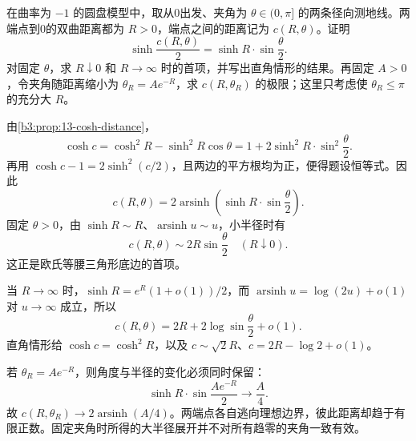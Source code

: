 \begin{exercise}[夹角与观察尺度]\label{b3:ex:13-1}
在曲率为 \(-1\) 的圆盘模型中，取从0出发、夹角为 \(\theta\in(0,\pi]\) 的两条径向测地线。两端点到0的双曲距离都为 \(R>0\)，端点之间的距离记为 \(c(R,\theta)\)。证明
\[
 \sinh\frac{c(R,\theta)}2=\sinh R\cdot\sin\frac\theta2.
\]
对固定 \(\theta\)，求 \(R\downarrow0\) 和 \(R\rightarrow\infty\) 时的首项，并写出直角情形的结果。再固定 \(A>0\)，令夹角随距离缩小为 \(\theta_R=Ae^{-R}\)，求 \(c(R,\theta_R)\) 的极限；这里只考虑使 \(\theta_R\le\pi\) 的充分大 \(R\)。
\end{exercise}
\begin{solution}
由\cref{b3:prop:13-cosh-distance}，
\[
 \cosh c=\cosh^2R-\sinh^2R\cos\theta
 =1+2\sinh^2R\cdot\sin^2\frac\theta2.
\]
再用 \(\cosh c-1=2\sinh^2(c/2)\)，且两边的平方根均为正，便得题设恒等式。因此
\[
 c(R,\theta)=2\operatorname{arsinh}\left(\sinh R\cdot\sin\frac\theta2\right).
\]
固定 \(\theta>0\)，由 \(\sinh R\sim R\)、\(\operatorname{arsinh}u\sim u\)，小半径时有
\[
 c(R,\theta)\sim2R\sin\frac\theta2\quad(R\downarrow0).
\]
这正是欧氏等腰三角形底边的首项。

当 \(R\rightarrow\infty\) 时，\(\sinh R=e^R(1+o(1))/2\)，而 \(\operatorname{arsinh}u=\log(2u)+o(1)\) 对 \(u\rightarrow\infty\) 成立，所以
\[
 c(R,\theta)=2R+2\log\sin\frac\theta2+o(1).
\]
直角情形给 \(\cosh c=\cosh^2R\)，以及 \(c\sim\sqrt2R\)、\(c=2R-\log2+o(1)\)。

若 \(\theta_R=Ae^{-R}\)，则角度与半径的变化必须同时保留：
\[
 \sinh R\cdot\sin\frac{Ae^{-R}}2\longrightarrow\frac A4.
\]
故 \(c(R,\theta_R)\rightarrow2\operatorname{arsinh}(A/4)\)。两端点各自逃向理想边界，彼此距离却趋于有限正数。固定夹角时所得的大半径展开并不对所有趋零的夹角一致有效。
\end{solution}

